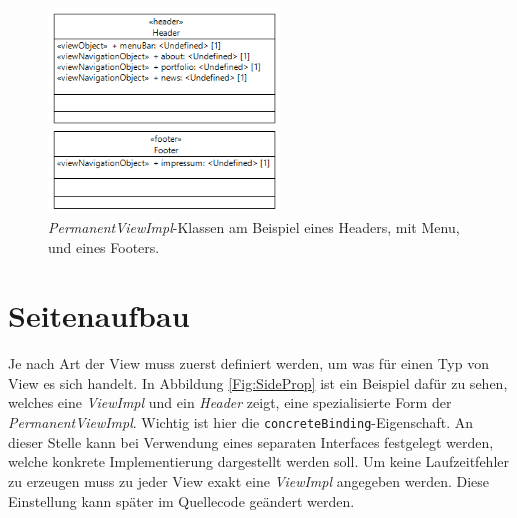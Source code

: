 \begin{figure}[htbp]
\begin{center}
\includegraphics[width=0.55\textwidth]{./img/Header_Footer.png}
\caption{\textit{PermanentViewImpl}-Klassen am Beispiel
eines Headers, mit Menu, und eines Footers.}\label{Fig:headerFooter}
\end{center}
\end{figure} 

\section{Seitenaufbau}
Je nach Art der View muss zuerst definiert werden, um was für einen Typ von
View es sich handelt. In Abbildung \ref{Fig:SideProp} ist ein Beispiel dafür
zu sehen, welches eine \textit{ViewImpl} und ein \textit{Header} zeigt, eine
spezialisierte Form der \textit{PermanentViewImpl}. Wichtig ist hier
die \texttt{concreteBinding}-Eigenschaft. An dieser Stelle kann bei Verwendung
eines separaten Interfaces festgelegt werden, welche konkrete Implementierung
dargestellt werden soll. Um keine Laufzeitfehler zu erzeugen muss zu jeder View
exakt eine \textit{ViewImpl} angegeben werden. Diese Einstellung kann später im
Quellecode geändert werden.

